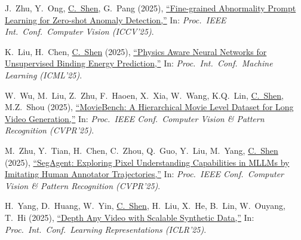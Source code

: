 \documentclass[9pt, a4paper]{article}
\newcommand{\years}[1]{\marginnote{\scriptsize #1}}
\def\highlight{\uline}
\begin{document}
\medskip

\years{2025} J.~Zhu, Y.~Ong, \highlight{C.~Shen}, G.~Pang (2025),
\href{http://www.google.com/search?lr=&ie=UTF-8&oe=UTF-8&q=Fine-grained+Abnormality+Prompt+Learning+for+Zero-shot+Anomaly+Detection+Jiawen+Zhu%2C+Yew-Soon+Ong%2C+Chunhua+Shen%2C+Guansong+Pang}{``Fine-grained Abnormality Prompt Learning for Zero-shot Anomaly Detection,{}''}
In: \emph{Proc.\ IEEE Int.\ Conf.\  Computer Vision (ICCV'25)}.

\medskip

\years{2025} K.~Liu, H.~Chen, \highlight{C.~Shen} (2025),
\href{http://www.google.com/search?lr=&ie=UTF-8&oe=UTF-8&q=Physics+Aware+Neural+Networks+for+Unsupervised+Binding+Energy+Prediction+Ke+Liu%2C+Hao+Chen%2C+Chunhua+Shen}{``Physics Aware Neural Networks for Unsupervised Binding Energy Prediction,{}''}
In: \emph{Proc.\ Int.\ Conf.\  Machine Learning (ICML'25)}.

\medskip

\years{2025} W.~Wu, M.~Liu, Z.~Zhu, F.~Haoen, X.~Xia, W.~Wang, K.Q.~Lin, \highlight{C.~Shen}, M.Z.~Shou (2025),
\href{http://www.google.com/search?lr=&ie=UTF-8&oe=UTF-8&q=MovieBench%3A+A+Hierarchical+Movie+Level+Dataset+for+Long+Video+Generation+Weijia+Wu%2C+Mingyu+Liu%2C+Zeyu+Zhu%2C+Feng+Haoen%2C+Xi+Xia%2C+Wen+Wang%2C+Kevin+Qinghong+Lin%2C+Chunhua+Shen%2C+Mike+Zheng+Shou}{``{MovieBench}: A Hierarchical Movie Level Dataset for Long Video Generation,{}''}
In: \emph{Proc.\ IEEE Conf.\  Computer Vision \& Pattern Recognition (CVPR'25)}.

\medskip

\years{2025} M.~Zhu, Y.~Tian, H.~Chen, C.~Zhou, Q.~Guo, Y.~Liu, M.~Yang, \highlight{C.~Shen} (2025),
\href{http://www.google.com/search?lr=&ie=UTF-8&oe=UTF-8&q=SegAgent%3A+Exploring+Pixel+Understanding+Capabilities+in+MLLMs+by+Imitating+Human+Annotator+Trajectories+Muzhi+Zhu%2C+Yuzhuo+Tian%2C+Hao+Chen%2C+Chunluan+Zhou%2C+Qingpei+Guo%2C+Yang+Liu%2C+Ming+Yang%2C+Chunhua+Shen}{``{SegAgent}: Exploring Pixel Understanding Capabilities in {MLLMs} by Imitating Human Annotator Trajectories,{}''}
In: \emph{Proc.\ IEEE Conf.\  Computer Vision \& Pattern Recognition (CVPR'25)}.

\medskip

\years{2025} H.~Yang, D.~Huang, W.~Yin, \highlight{C.~Shen}, H.~Liu, X.~He, B.~Lin, W.~Ouyang, T.~Hi (2025),
\href{http://www.google.com/search?lr=&ie=UTF-8&oe=UTF-8&q=Depth+Any+Video+with+Scalable+Synthetic+Data+Honghui+Yang%2C+Di+Huang%2C+Wei+Yin%2C+Chunhua+Shen%2C+Haifeng+Liu%2C+Xiaofei+He%2C+Binbin+Lin%2C+Wanli+Ouyang%2C+Tong+Hi}{``Depth Any Video with Scalable Synthetic Data,{}''}
In: \emph{Proc.\ Int.\ Conf.\  Learning Representations (ICLR'25)}.
\end{document}
